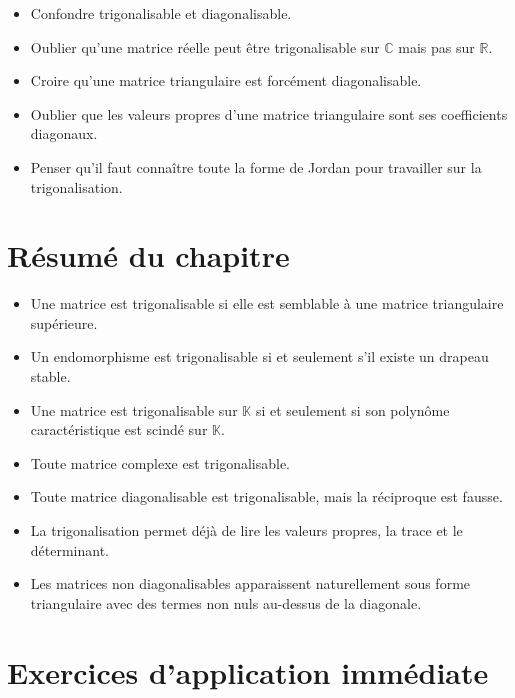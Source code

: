 \documentclass[11pt,a4paper]{article}
\theoremstyle{remark}
\newcommand{\R}{\mathbb{R}}
\newcommand{\C}{\mathbb{C}}
\newcommand{\K}{\mathbb{K}}
\begin{document}
\begin{itemize}
    \item Confondre trigonalisable et diagonalisable.
    \item Oublier qu’une matrice réelle peut être trigonalisable sur \(\C\) mais pas sur \(\R\).
    \item Croire qu’une matrice triangulaire est forcément diagonalisable.
    \item Oublier que les valeurs propres d’une matrice triangulaire sont ses coefficients diagonaux.
    \item Penser qu’il faut connaître toute la forme de Jordan pour travailler sur la trigonalisation.
\end{itemize}

\section{Résumé du chapitre}

\begin{itemize}
    \item Une matrice est trigonalisable si elle est semblable à une matrice triangulaire supérieure.
    \item Un endomorphisme est trigonalisable si et seulement s’il existe un drapeau stable.
    \item Une matrice est trigonalisable sur \(\K\) si et seulement si son polynôme caractéristique est scindé sur \(\K\).
    \item Toute matrice complexe est trigonalisable.
    \item Toute matrice diagonalisable est trigonalisable, mais la réciproque est fausse.
    \item La trigonalisation permet déjà de lire les valeurs propres, la trace et le déterminant.
    \item Les matrices non diagonalisables apparaissent naturellement sous forme triangulaire avec des termes non nuls au-dessus de la diagonale.
\end{itemize}

\section*{Exercices d’application immédiate}
\end{document}
